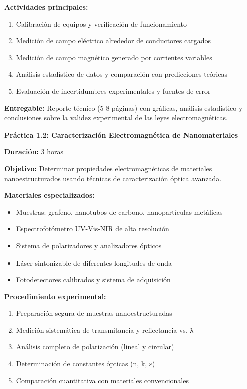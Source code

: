\begin{tecnologiabox}
\begin{tecnologiabox}
\begin{tecnologiabox}
\begin{teknologiabox}
\begin{practicabox}
\textbf{Actividades principales:}
\begin{enumerate}
\item Calibración de equipos y verificación de funcionamiento
\item Medición de campo eléctrico alrededor de conductores cargados
\item Medición de campo magnético generado por corrientes variables
\item Análisis estadístico de datos y comparación con predicciones teóricas
\item Evaluación de incertidumbres experimentales y fuentes de error
\end{enumerate}

\textbf{Entregable:} Reporte técnico (5-8 páginas) con gráficas, análisis estadístico y conclusiones sobre la validez experimental de las leyes electromagnéticas.
\end{practicabox}

\begin{practicabox}
\textbf{Práctica 1.2: Caracterización Electromagnética de Nanomateriales}

\textbf{Duración:} 3 horas

\textbf{Objetivo:} Determinar propiedades electromagnéticas de materiales nanoestructurados usando técnicas de caracterización óptica avanzada.

\textbf{Materiales especializados:}
\begin{itemize}
\item Muestras: grafeno, nanotubos de carbono, nanopartículas metálicas
\item Espectrofotómetro UV-Vis-NIR de alta resolución
\item Sistema de polarizadores y analizadores ópticos
\item Láser sintonizable de diferentes longitudes de onda
\item Fotodetectores calibrados y sistema de adquisición
\end{itemize}

\textbf{Procedimiento experimental:}
\begin{enumerate}
\item Preparación segura de muestras nanoestructuradas
\item Medición sistemática de transmitancia y reflectancia vs. λ
\item Análisis completo de polarización (lineal y circular)
\item Determinación de constantes ópticas (n, k, ε)
\item Comparación cuantitativa con materiales convencionales
\end{enumerate}


\end{practicabox}
\end{teknologiabox}
\end{tecnologiabox}
\end{tecnologiabox}
\end{tecnologiabox}
